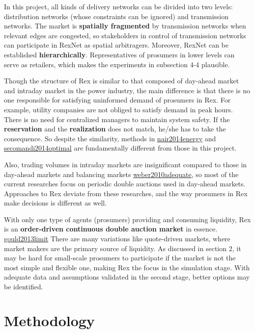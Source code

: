 \documentclass[letterpaper,8pt,twocolumn,twoside,]{pinp}
\begin{document}
In this project, all kinds of delivery networks can be divided into two
levels: distribution networks (whose constraints can be ignored) and
transmission networks. The market is \textbf{spatially fragmented} by
transmission networks when relevant edges are congested, so stakeholders
in control of transmission networks can participate in RexNet as spatial
arbitragers. Moreover, RexNet can be established
\textbf{hierarchically}. Representatives of prosumers in lower levels
can serve as retailers, which makes the experiments in subsection 4-4
plausible.

Though the structure of Rex is similar to that composed of day-ahead
market and intraday market in the power industry, the main difference is
that there is no one responsible for satisfying uninformed demand of
prosumers in Rex. For example, utility companies are not obliged to
satisfy demand in peak hours. There is no need for centralized managers
to maintain system safety. If the \textbf{reservation} and the
\textbf{realization} does not match, he/she has to take the consequence.
So despite the similarity, methods in
\protect\hyperlink{reference}{nair2014energy} and
\protect\hyperlink{reference}{secomandi2014optimal} are fundamentally
different from those in this project.

Also, trading volumes in intraday markets are insignificant compared to
those in day-ahead markets and balancing markets
\protect\hyperlink{reference}{weber2010adequate}, so most of the current
researches focus on periodic double auctions used in day-ahead markets.
Approaches to Rex deviate from these researches, and the way prosumers
in Rex make decisions is different as well.

With only one type of agents (prosumers) providing and consuming
liquidity, Rex is an \textbf{order-driven continuous double auction
market} in essence. \protect\hyperlink{reference}{gould2013limit} There
are many variations like quote-driven markets, where market makers are
the primary source of liquidity. As discussed in section 2, it may be
hard for small-scale prosumers to participate if the market is not the
most simple and flexible one, making Rex the focus in the simulation
stage. With adequate data and assumptions validated in the second stage,
better options may be identified.

\hypertarget{methodology}{%
\section{Methodology}\label{methodology}}
\end{document}
